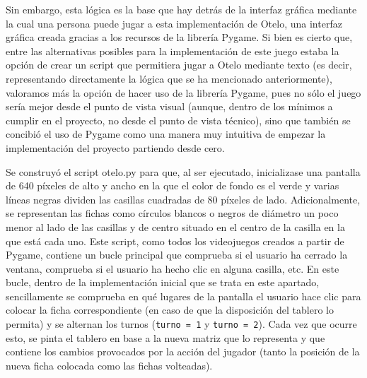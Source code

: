 \documentclass[conference]{IEEEtran}
\begin{document}
Sin embargo, esta lógica es la base que hay detrás de la interfaz gráfica mediante la cual una persona puede jugar a esta implementación de Otelo, una interfaz gráfica creada gracias a los recursos de la librería Pygame. Si bien es cierto que, entre las alternativas posibles para la implementación de este juego estaba la opción de crear un script que permitiera jugar a Otelo mediante texto (es decir, representando directamente la lógica que se ha mencionado anteriormente), valoramos más la opción de hacer uso de la librería Pygame, pues no sólo el juego sería mejor desde el punto de vista visual (aunque, dentro de los mínimos a cumplir en el proyecto, no desde el punto de vista técnico), sino que también se concibió el uso de Pygame como una manera muy intuitiva de empezar la implementación del proyecto partiendo desde cero.

Se construyó el script otelo.py para que, al ser ejecutado, inicializase una pantalla de 640 píxeles de alto y ancho en la que el color de fondo es el verde y varias líneas negras dividen las casillas cuadradas de 80 píxeles de lado. Adicionalmente, se representan las fichas como círculos blancos o negros de diámetro un poco menor al lado de las casillas y de centro situado en el centro de la casilla en la que está cada uno. Este script, como todos los videojuegos creados a partir de Pygame, contiene un bucle principal que comprueba si el usuario ha cerrado la ventana, comprueba si el usuario ha hecho clic en alguna casilla, etc. En este bucle, dentro de la implementación inicial que se trata en este apartado, sencillamente se comprueba en qué lugares de la pantalla el usuario hace clic para colocar la ficha correspondiente (en caso de que la disposición del tablero lo permita) y se alternan los turnos (\texttt{turno = 1} y \texttt{turno = 2}). Cada vez que ocurre esto, se pinta el tablero en base a la nueva matriz que lo representa y que contiene los cambios provocados por la acción del jugador (tanto la posición de la nueva ficha colocada como las fichas volteadas).
\end{document}
